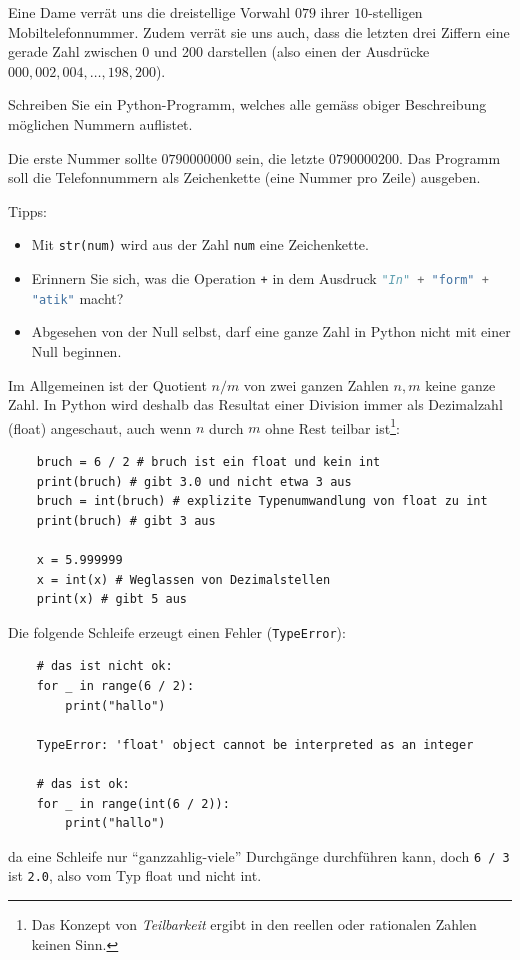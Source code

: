\begin{myexercise}\label{ex:str}
	Eine Dame verrät uns die dreistellige Vorwahl $079$ ihrer $10$-stelligen Mobiltelefonnummer. Zudem verrät sie uns auch, dass die letzten drei Ziffern eine gerade Zahl zwischen 0 und 200 darstellen (also einen der Ausdrücke $000, 002, 004, \ldots, 198, 200$).

	Schreiben Sie ein Python-Programm, welches alle gemäss obiger Beschreibung möglichen Nummern auflistet.
	
	Die erste Nummer sollte $0790000000$ sein, die letzte $0790000200$.
	Das Programm soll die Telefonnummern als Zeichenkette (eine Nummer pro Zeile) ausgeben.

	Tipps:
	\begin{itemize}
		\item Mit \lstinline|str(num)|
		      wird aus der Zahl \lstinline|num| eine Zeichenkette.
		\item Erinnern Sie sich, was die Operation \lstinline|+| in dem Ausdruck \lstinline[language=Python,basicstyle=\ttfamily\normalsize]!"In" + "form" + "atik"! macht?
		\item Abgesehen von der Null selbst, darf eine ganze Zahl in Python nicht mit einer Null beginnen.
	\end{itemize}
	\begin{myanswer}
		
	\end{myanswer}
\end{myexercise}

\begin{myattention}\label{myattention:float_not_int}
	Im Allgemeinen ist der Quotient $n / m$ von zwei ganzen Zahlen $n, m$ keine ganze Zahl. In Python wird deshalb das Resultat einer Division immer als Dezimalzahl (float) angeschaut, auch wenn $n$ durch $m$ ohne Rest teilbar ist\footnote{Das Konzept von \emph{Teilbarkeit} ergibt in den reellen oder rationalen Zahlen keinen Sinn.}:
	\begin{lstlisting}
	bruch = 6 / 2 # bruch ist ein float und kein int
	print(bruch) # gibt 3.0 und nicht etwa 3 aus
	bruch = int(bruch) # explizite Typenumwandlung von float zu int
	print(bruch) # gibt 3 aus

	x = 5.999999 
	x = int(x) # Weglassen von Dezimalstellen
	print(x) # gibt 5 aus
	\end{lstlisting}
	Die folgende Schleife erzeugt einen Fehler (\texttt{TypeError}):
	\begin{lstlisting}
	# das ist nicht ok:
	for _ in range(6 / 2):
		print("hallo")

	TypeError: 'float' object cannot be interpreted as an integer
	
	# das ist ok:
	for _ in range(int(6 / 2)):
		print("hallo")
	\end{lstlisting}
	da eine Schleife nur \enquote{ganzzahlig-viele} Durchgänge durchführen kann, doch \texttt{6 / 3} ist \texttt{2.0}, also vom Typ float und nicht int.
\end{myattention}


